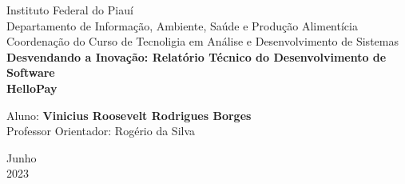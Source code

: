 \documentclass[a4paper,12pt]{article}
\begin{document}
\begin{titlepage}
    \begin{center}


        \Huge{Instituto Federal do Piauí}\\
        \large{Departamento de Informação, Ambiente, Saúde e Produção Alimentícia}\\
        \large{Coordenação do Curso de Tecnoligia em Análise e Desenvolvimento de Sistemas}\\
        \vspace{15pt}
        \vspace{95pt}
        \textbf{\large{Desvendando a Inovação: Relatório Técnico do Desenvolvimento de Software}}\\
        \vspace{1,5cm}
        \textbf{{\LARGE{HelloPay}}}
        \vspace{3,5cm}
    \end{center}

    \begin{flushleft}
        \begin{tabbing}
            Aluno: \textbf{Vinicius Roosevelt Rodrigues Borges}\\
            Professor Orientador: Rogério da Silva\\
        \end{tabbing}
    \end{flushleft}
    \vspace{1cm}

    \begin{center}
        \vspace{\fill}
        Junho\\
        2023
    \end{center}
\end{titlepage}
\end{document}
